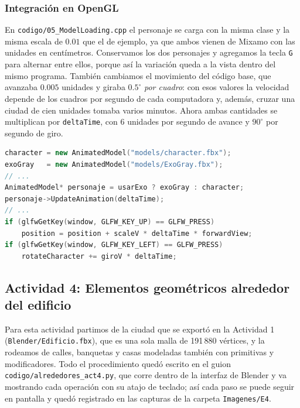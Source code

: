 \subsubsection{Integración en OpenGL}
En \texttt{codigo/05\_ModelLoading.cpp} el personaje se carga con la misma clase y la misma escala de $0.01$ que el de ejemplo, ya que ambos vienen de Mixamo con las unidades en centímetros. Conservamos los dos personajes y agregamos la tecla \texttt{G} para alternar entre ellos, porque así la variación queda a la vista dentro del mismo programa. También cambiamos el movimiento del código base, que avanzaba $0.005$ unidades y giraba $0.5^\circ$ \textit{por cuadro}: con esos valores la velocidad depende de los cuadros por segundo de cada computadora y, además, cruzar una ciudad de cien unidades tomaba varios minutos. Ahora ambas cantidades se multiplican por \texttt{deltaTime}, con 6 unidades por segundo de avance y $90^\circ$ por segundo de giro.

\begin{lstlisting}[language=C++, caption={Carga de los dos personajes y avance independiente de los cuadros por segundo.}, label={lst:personaje_cpp}]
character = new AnimatedModel("models/character.fbx");
exoGray   = new AnimatedModel("models/ExoGray.fbx");
// ...
AnimatedModel* personaje = usarExo ? exoGray : character;
personaje->UpdateAnimation(deltaTime);
// ...
if (glfwGetKey(window, GLFW_KEY_UP) == GLFW_PRESS)
    position = position + scaleV * deltaTime * forwardView;
if (glfwGetKey(window, GLFW_KEY_LEFT) == GLFW_PRESS)
    rotateCharacter += giroV * deltaTime;
\end{lstlisting}

\subsection{Actividad 4: Elementos geométricos alrededor del edificio}

Para esta actividad partimos de la ciudad que se exportó en la Actividad 1 (\texttt{Blender/Edificio.fbx}), que es una sola malla de 191\,880 vértices, y la rodeamos de calles, banquetas y casas modeladas también con primitivas y modificadores. Todo el procedimiento quedó escrito en el guion \texttt{codigo/alrededores\_act4.py}, que corre dentro de la interfaz de Blender y va mostrando cada operación con su atajo de teclado; así cada paso se puede seguir en pantalla y quedó registrado en las capturas de la carpeta \texttt{Imagenes/E4}.

